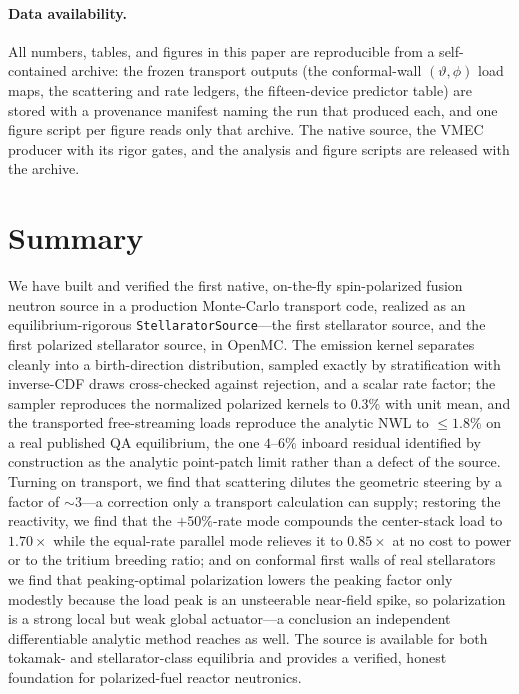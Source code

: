 \documentclass[11pt]{article}
\begin{document}
\paragraph{Data availability.}
All numbers, tables, and figures in this paper are reproducible from a self-contained
archive: the frozen transport outputs (the conformal-wall $(\vartheta,\phi)$ load maps, the
scattering and rate ledgers, the fifteen-device predictor table) are stored with a
provenance manifest naming the run that produced each, and one figure script per figure
reads only that archive. The native source, the VMEC producer with its rigor gates, and the
analysis and figure scripts are released with the archive.

\section{Summary}
\label{sec:summary}

We have built and verified the first native, on-the-fly spin-polarized fusion neutron
source in a production Monte-Carlo transport code, realized as an equilibrium-rigorous
\texttt{StellaratorSource}---the first stellarator source, and the first polarized
stellarator source, in OpenMC. The emission kernel separates cleanly into a birth-direction
distribution, sampled exactly by stratification with inverse-CDF draws cross-checked
against rejection, and a scalar rate factor; the sampler reproduces the normalized polarized
kernels to $0.3\%$ with unit mean, and the transported free-streaming loads reproduce the
analytic NWL to $\le1.8\%$ on a real published QA equilibrium, the one $4$--$6\%$ inboard
residual identified by construction as the analytic point-patch limit rather than a defect
of the source. Turning on transport, we find that scattering dilutes the geometric steering
by a factor of $\sim\!3$---a correction only a transport calculation can supply; restoring
the reactivity, we find that the $+50\%$-rate mode compounds the center-stack load to
$1.70\times$ while the equal-rate parallel mode relieves it to $0.85\times$ at no cost to
power or to the tritium breeding ratio; and on conformal first walls of real stellarators we
find that peaking-optimal polarization lowers the peaking factor only modestly because the
load peak is an unsteerable near-field spike, so polarization is a strong local but weak
global actuator---a conclusion an independent differentiable analytic method reaches as
well. The source is available for both tokamak- and stellarator-class equilibria and
provides a verified, honest foundation for polarized-fuel reactor neutronics.
\end{document}
